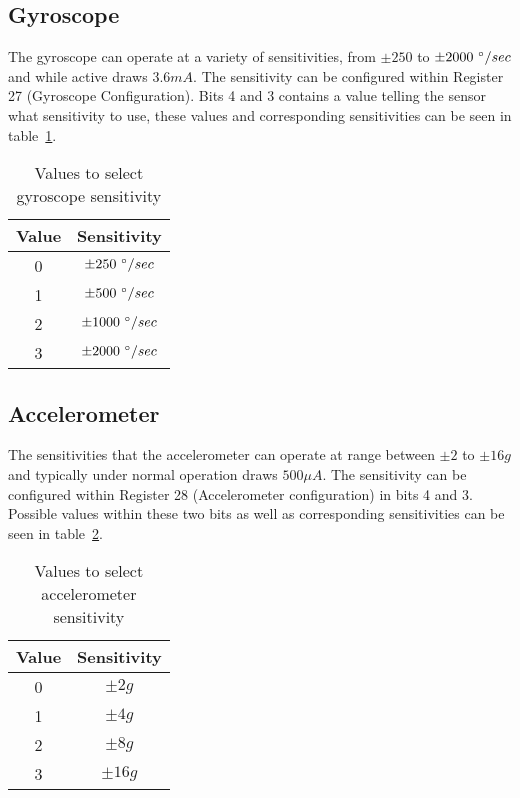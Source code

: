 \subsection{Gyroscope}

The gyroscope can operate at a variety of sensitivities, from $\pm 250$ to $\pm 2000~\degree / sec$ and while active draws $3.6mA$. The sensitivity can be configured within Register 27 (Gyroscope Configuration). Bits 4 and 3 contains a value telling the sensor what sensitivity to use, these values and corresponding sensitivities can be seen in table~\ref{tab:gyro:range}. \cite{sensor_registers}

\begin{table}
	\centering
	\begin{tabular}{|c|c|}
		\hline
		Value & Sensitivity \\
		\hline
		0 & $\pm 250~\degree / sec$ \\
		1 & $\pm 500~\degree / sec$ \\
		2 & $\pm 1000~\degree / sec$ \\
		3 & $\pm 2000~\degree / sec$ \\
		\hline
	\end{tabular}
	\caption{Values to select gyroscope sensitivity}
	\label{tab:gyro:range}
\end{table}

\subsection{Accelerometer}

The sensitivities that the accelerometer can operate at range between $\pm 2$ to $\pm 16g$ and typically under normal operation draws $500\mu A$. The sensitivity can be configured within Register 28 (Accelerometer configuration) in bits 4 and 3. Possible values within these two bits as well as corresponding sensitivities can be seen in table~\ref{tab:accel:range}. \cite{sensor_registers}

\begin{table}
	\centering
	\begin{tabular}{|c|c|}
		\hline
		Value & Sensitivity \\
		\hline
		0 & $\pm 2g$ \\
		1 & $\pm 4g$ \\
		2 & $\pm 8g$ \\
		3 & $\pm 16g$ \\
		\hline
	\end{tabular}
	\caption{Values to select accelerometer sensitivity}
	\label{tab:accel:range}
\end{table}

